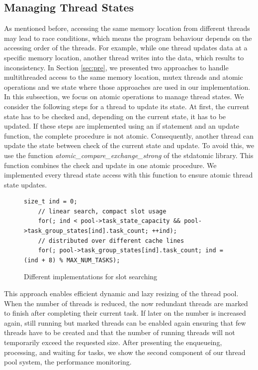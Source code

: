 \documentclass[conference]{IEEEtran}
\begin{document}
\subsection{Managing Thread States}
As mentioned before, accessing the same memory location from different threads may lead to race conditions, which means the program behaviour depends on the accessing order of the threads. For example, while one thread updates data at a specific memory location, another thread writes into the data, which results to inconsistency. In Section \ref{sec:pre}, we presented two approaches to handle multithreaded access to the same memory location, mutex threads and atomic operations and we state where those approaches are used in our implementation. In this subsection, we focus on atomic operations to manage thread states. We consider the following steps for a thread to update its state. At first, the current state has to be checked and, depending on the current state, it has to be updated. If these steps are implemented using an if statement and an update function, the complete procedure is not atomic. Consequently, another thread can update the state between check of the current state and update. To avoid this, we use the function \emph{atomic\_compare\_exchange\_strong} \cite{atomicstrong} of the stdatomic library. This function combines the check and update in one atomic procedure. We implemented every thread state access with this function to ensure atomic thread state updates. 

\begin{figure}
	\begin{lstlisting}[style=CStyle,numbers=none]
	size_t ind = 0;
	// linear search, compact slot usage
	for(; ind < pool->task_state_capacity && pool->task_group_states[ind].task_count; ++ind);
	// distributed over different cache lines
	for(; pool->task_group_states[ind].task_count; ind = (ind + 8) % MAX_NUM_TASKS);
	\end{lstlisting}
	\caption{Different implementations for slot searching}
	\label{fig10}
\end{figure}

This approach enables efficient dynamic and lazy resizing of the thread pool. When the number of threads is reduced, the now redundant threads are marked to finish after completing their current task. If later on the number is increased again, still running but marked threads can be enabled again ensuring that few threads have to be created and that the number of running threads will not temporarily exceed the requested size. 
 After presenting the enqueueing, processing, and waiting for tasks, we show the second component of our thread pool system, the performance monitoring.
\end{document}
